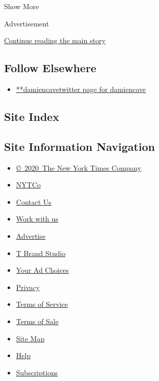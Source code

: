 Show More

Advertisement

\protect\hyperlink{after-mid2}{Continue reading the main story}

\hypertarget{follow-elsewhere}{%
\subsection{Follow Elsewhere}\label{follow-elsewhere}}

\begin{itemize}
\tightlist
\item
  \href{https://twitter.com/damiencave}{**damiencavetwitter page for
  damiencave}
\end{itemize}

\hypertarget{site-index}{%
\subsection{Site Index}\label{site-index}}

\hypertarget{site-information-navigation}{%
\subsection{Site Information
Navigation}\label{site-information-navigation}}

\begin{itemize}
\tightlist
\item
  \href{https://help.nytimes.com/hc/en-us/articles/115014792127-Copyright-notice}{©~2020~The
  New York Times Company}
\end{itemize}

\begin{itemize}
\tightlist
\item
  \href{https://www.nytco.com/}{NYTCo}
\item
  \href{https://help.nytimes.com/hc/en-us/articles/115015385887-Contact-Us}{Contact
  Us}
\item
  \href{https://www.nytco.com/careers/}{Work with us}
\item
  \href{https://nytmediakit.com/}{Advertise}
\item
  \href{http://www.tbrandstudio.com/}{T Brand Studio}
\item
  \href{https://www.nytimes.com/privacy/cookie-policy\#how-do-i-manage-trackers}{Your
  Ad Choices}
\item
  \href{https://www.nytimes.com/privacy}{Privacy}
\item
  \href{https://help.nytimes.com/hc/en-us/articles/115014893428-Terms-of-service}{Terms
  of Service}
\item
  \href{https://help.nytimes.com/hc/en-us/articles/115014893968-Terms-of-sale}{Terms
  of Sale}
\item
  \href{https://spiderbites.nytimes.com}{Site Map}
\item
  \href{https://help.nytimes.com/hc/en-us}{Help}
\item
  \href{https://www.nytimes.com/subscription?campaignId=37WXW}{Subscriptions}
\end{itemize}
